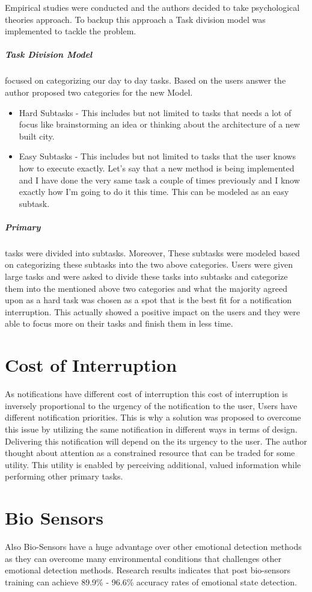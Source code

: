 Empirical studies were conducted and the authors decided to take psychological theories approach. To backup this approach a Task division model was implemented to tackle the problem.
\subparagraph{Task Division Model}
focused on categorizing our day to day tasks. Based on the users answer the author proposed two categories for the new Model.
\begin{itemize}
	\item Hard Subtasks - This includes but not limited to tasks that needs a lot of focus like brainstorming an idea or thinking about the architecture of a new built city.
	\item Easy Subtasks - This includes but not limited to tasks that the user knows how to execute exactly. Let's say that a new method is being implemented and I have done the very same task a couple of times previously and I know exactly how I'm going to do it this time. This can be modeled as an easy subtask.
\end{itemize}
\subparagraph{Primary}
tasks were divided into subtasks. Moreover, These subtasks were modeled based on categorizing these subtasks into the two above categories. Users were given large tasks and were asked to divide these tasks into subtasks and categorize them into the mentioned above two categories and what the majority agreed upon as a hard task was chosen as a spot that is the best fit for a notification interruption. This actually showed a positive impact on the users and they were able to focus more on their tasks and finish them in less time.\cite{citeKey5}

\section{Cost of Interruption}
As notifications have different cost of interruption this cost of interruption is inversely proportional to the urgency of the notification to the user, Users have different notification priorities. This is why a solution was proposed to overcome this issue by utilizing the same notification in different ways in terms of design. Delivering this notification will depend on the its urgency to the user. The author thought about attention as a constrained resource that can be traded for some utility. This utility is enabled by perceiving additional, valued information while performing other primary tasks. \cite{citeKey6}

\section{Bio Sensors}
Also Bio-Sensors have a huge advantage over other emotional detection methods as they can overcome many environmental conditions that challenges other emotional detection methods. Research results indicates that post bio-sensors training can achieve 89.9\% - 96.6\% accuracy rates of emotional state detection. \cite{citeKey4}